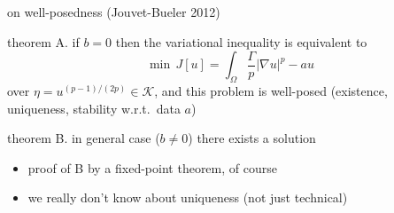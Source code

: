 \documentclass[hide notes,intlimits]{beamer}
\newcommand{\Kcal}{\mathcal{K}}
\newcommand{\grad}{\nabla}
\begin{document}
\begin{frame}{on well-posedness (Jouvet-Bueler 2012)} 
\begin{block}{theorem A.}
if $b=0$ then the variational inequality is equivalent to
  $$\min \, J[u] = \int_{\Omega} \frac{\Gamma}{p} |\grad u|^p - a u$$
over $\eta = u^{(p-1)/(2p)} \in \Kcal$, and this problem is well-posed (existence, uniqueness, stability w.r.t.~data $a$)
\end{block}
\begin{block}{theorem B.}
in general case ($b\ne 0$) there exists a solution
\end{block}
\begin{itemize}
\item proof of B by a fixed-point theorem, of course
\item we really don't know about uniqueness (not just technical)
\end{itemize}
\end{frame}
\end{document}
